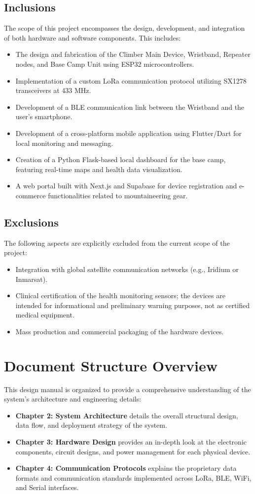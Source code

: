 \subsection{Inclusions}
The scope of this project encompasses the design, development, and integration of both hardware and software components. This includes:
\begin{itemize}
    \item The design and fabrication of the Climber Main Device, Wristband, Repeater nodes, and Base Camp Unit using ESP32 microcontrollers.
    \item Implementation of a custom LoRa communication protocol utilizing SX1278 transceivers at 433 MHz.
    \item Development of a BLE communication link between the Wristband and the user's smartphone.
    \item Development of a cross-platform mobile application using Flutter/Dart for local monitoring and messaging.
    \item Creation of a Python Flask-based local dashboard for the base camp, featuring real-time maps and health data visualization.
    \item A web portal built with Next.js and Supabase for device registration and e-commerce functionalities related to mountaineering gear.
\end{itemize}

\subsection{Exclusions}
The following aspects are explicitly excluded from the current scope of the project:
\begin{itemize}
    \item Integration with global satellite communication networks (e.g., Iridium or Inmarsat).
    \item Clinical certification of the health monitoring sensors; the devices are intended for informational and preliminary warning purposes, not as certified medical equipment.
    \item Mass production and commercial packaging of the hardware devices.
\end{itemize}

\section{Document Structure Overview}
This design manual is organized to provide a comprehensive understanding of the system's architecture and engineering details:
\begin{itemize}
    \item \textbf{Chapter 2: System Architecture} details the overall structural design, data flow, and deployment strategy of the system.
    \item \textbf{Chapter 3: Hardware Design} provides an in-depth look at the electronic components, circuit designs, and power management for each physical device.
    \item \textbf{Chapter 4: Communication Protocols} explains the proprietary data formats and communication standards implemented across LoRa, BLE, WiFi, and Serial interfaces.
\end{itemize}
